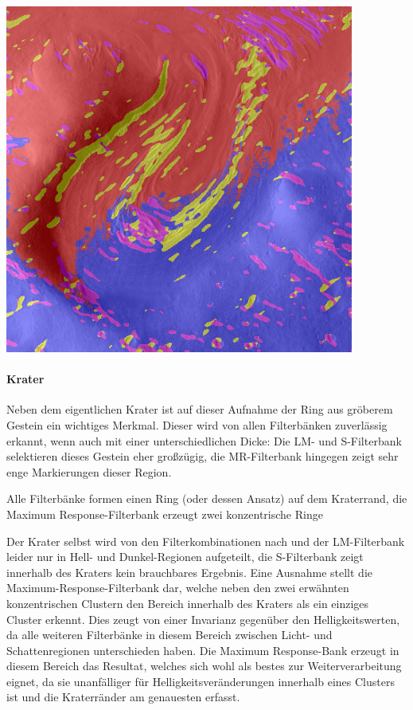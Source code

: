 \begin{table}[h!]
\begin{tabularx}{\textwidth}
		\includegraphics[width=.9\linewidth]{images/gen/filterbanks/Gre13_05.jpg_MR.png} \\
		\bottomrule
	\end{tabularx}
	\caption{Vergleich verschiedener Filterbänke auf Bildern der Marsoberfläche. Die Farben der jeweiligen Cluster wurden zufällig gewählt und sagen nichts über deren Inhalt aus. Alle Bilder wurden in vier Cluster eingeteilt.}
	\label{tab:filterbank_comparision}
\end{table}

\paragraph{Krater}
Neben dem eigentlichen Krater ist auf dieser Aufnahme der Ring aus gröberem Gestein ein wichtiges Merkmal. Dieser wird von allen Filterbänken zuverlässig erkannt, wenn auch mit einer unterschiedlichen Dicke: Die LM- und S-Filterbank selektieren dieses Gestein eher großzügig, die MR-Filterbank hingegen zeigt sehr enge Markierungen dieser Region.

Alle Filterbänke formen einen Ring (oder dessen Ansatz) auf dem Kraterrand, die Maximum Response-Filterbank erzeugt zwei konzentrische Ringe

Der Krater selbst wird von den Filterkombinationen nach \cite{jain_91} und der LM-Filterbank leider nur in Hell- und Dunkel-Regionen aufgeteilt, die S-Filterbank zeigt innerhalb des Kraters kein brauchbares Ergebnis. Eine Ausnahme stellt die Maximum-Response-Filterbank dar, welche neben den zwei erwähnten konzentrischen Clustern den Bereich innerhalb des Kraters als ein einziges Cluster erkennt. Dies zeugt von einer Invarianz gegenüber den Helligkeitswerten, da alle weiteren Filterbänke in diesem Bereich zwischen Licht- und Schattenregionen unterschieden haben. Die Maximum Response-Bank erzeugt in diesem Bereich das Resultat, welches sich wohl als bestes zur Weiterverarbeitung eignet, da sie unanfälliger für Helligkeitsveränderungen innerhalb eines Clusters ist und die Kraterränder am genauesten erfasst.

